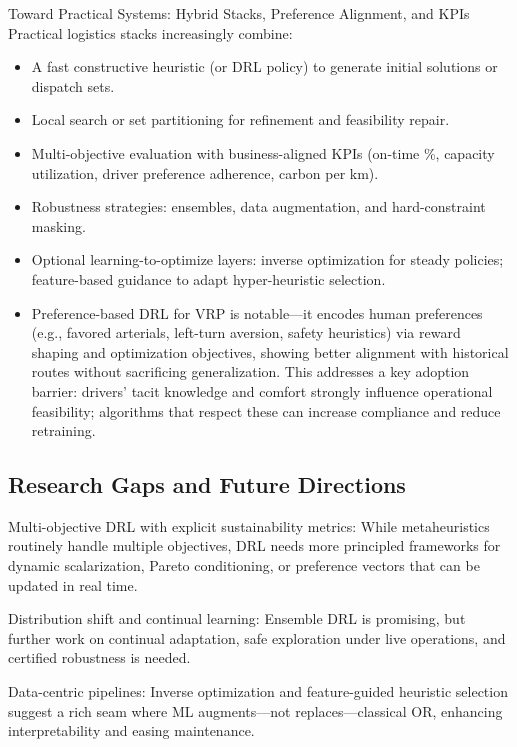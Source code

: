 Toward Practical Systems: Hybrid Stacks, Preference Alignment, and KPIs
Practical logistics stacks increasingly combine:

\begin{itemize}
    \item A fast constructive heuristic (or DRL policy) to generate initial solutions or dispatch sets.
    \item Local search or set partitioning for refinement and feasibility repair.

    \item Multi-objective evaluation with business-aligned KPIs (on-time \%, capacity utilization, driver preference adherence, carbon per km).

    \item Robustness strategies: ensembles, data augmentation, and hard-constraint masking.
    
    \item Optional learning-to-optimize layers: inverse optimization for steady policies; feature-based guidance to adapt hyper-heuristic selection.
    
    \item Preference-based DRL for VRP is notable—it encodes human preferences (e.g., favored arterials, left-turn aversion, safety heuristics) via reward shaping and optimization objectives, showing better alignment with historical routes without sacrificing generalization. This addresses a key adoption barrier: drivers’ tacit knowledge and comfort strongly influence operational feasibility; algorithms that respect these can increase compliance and reduce retraining.
\end{itemize}



\subsection{Research Gaps and Future Directions}

Multi-objective DRL with explicit sustainability metrics: While metaheuristics routinely handle multiple objectives, DRL needs more principled frameworks for dynamic scalarization, Pareto conditioning, or preference vectors that can be updated in real time.​

Distribution shift and continual learning: Ensemble DRL is promising, but further work on continual adaptation, safe exploration under live operations, and certified robustness is needed.​

Data-centric pipelines: Inverse optimization and feature-guided heuristic selection suggest a rich seam where ML augments—not replaces—classical OR, enhancing interpretability and easing maintenance.​

